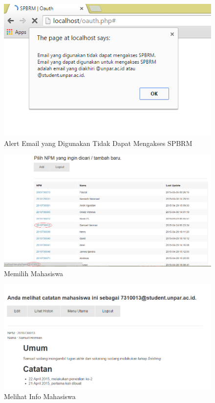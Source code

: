 \begin{figure}[H]
\centering
\includegraphics[scale=0.44]{Gambar/pengujian7.png}
\caption[Alert Email yang Digunakan Tidak Dapat Mengakses SPBRM]{Alert Email yang
Digunakan Tidak Dapat Mengakses SPBRM}
\label{fig:alert}
\end{figure}

\begin{figure}[H]
\centering
\includegraphics[scale=0.445]{Gambar/pengujian8.png}
\caption[Memilih Mahasiswa]{Memilih Mahasiswa} 
\label{fig:memilihmahasiswa}
\end{figure}

\begin{figure}[H]
\centering
\includegraphics[scale=0.44]{Gambar/pengujian9.png}
\caption[Melihat Info Mahasiswa]{Melihat Info Mahasiswa} 
\label{fig:melihatinfomahasiswa}
\end{figure}

